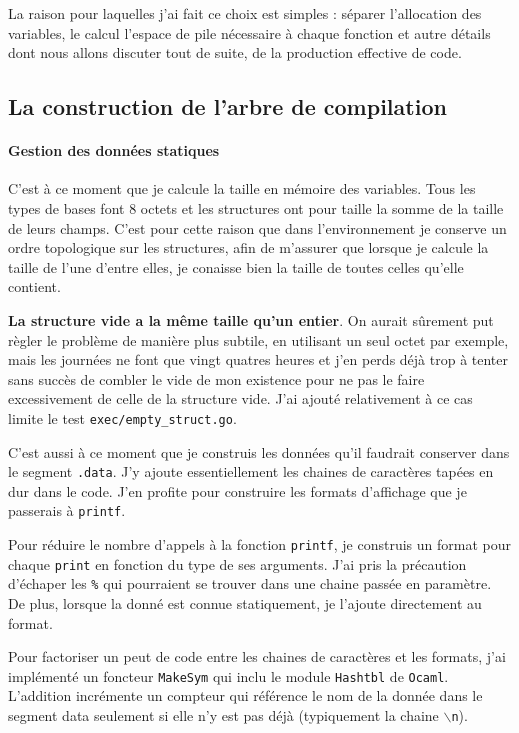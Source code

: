 \documentclass{article}
\begin{document}
La raison pour laquelles j'ai fait ce choix est simples : séparer l'allocation des variables, le calcul l'espace de pile nécessaire à chaque fonction et autre détails dont nous allons discuter tout de suite, de la production effective de code.

\subsection{La construction de l'arbre de compilation}

\paragraph{Gestion des données statiques}

C'est à ce moment que je calcule la taille en mémoire des variables. Tous les types de bases font 8 octets et les structures ont pour taille la somme de la taille de leurs champs. C'est pour cette raison que dans l'environnement je conserve un ordre topologique sur les structures, afin de m'assurer que lorsque je calcule la taille de l'une d'entre elles, je conaisse bien la taille de toutes celles qu'elle contient.

\textbf{La structure vide a la même taille qu'un entier}. On aurait sûrement put règler le problème de manière plus subtile, en utilisant un seul octet par exemple, mais les journées ne font que vingt quatres heures et j'en perds déjà trop à tenter sans succès de combler le vide de mon existence pour ne pas le faire excessivement de celle de la structure vide. J'ai ajouté relativement à ce cas limite le test \texttt{exec/empty\_struct.go}.

C'est aussi à ce moment que je construis les données qu'il faudrait conserver dans le segment \texttt{.data}. J'y ajoute essentiellement les chaines de caractères tapées en dur dans le code. J'en profite pour construire les formats d'affichage que je passerais à \texttt{printf}.

Pour réduire le nombre d'appels à la fonction \texttt{printf}, je construis un format pour chaque \texttt{print} en fonction du type de ses arguments. J'ai pris la précaution d'échaper les \texttt{\%} qui pourraient se trouver dans une chaine passée en paramètre. De plus, lorsque la donné est connue statiquement, je l'ajoute directement au format.

Pour factoriser un peut de code entre les chaines de caractères et les formats, j'ai implémenté un foncteur \texttt{MakeSym} qui inclu le module \texttt{Hashtbl} de \texttt{Ocaml}. L'addition incrémente un compteur qui référence le nom de la donnée dans le segment data seulement si elle n'y est pas déjà (typiquement la chaine \(\backslash\)\texttt{n}).
\end{document}
